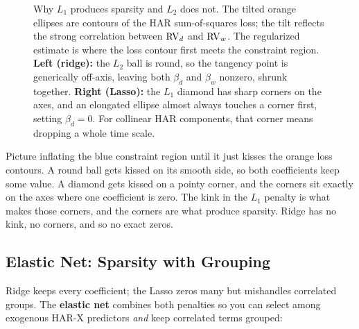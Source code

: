 \begin{figure}[htbp]
\caption{Why $L_1$ produces sparsity and $L_2$ does not.
The tilted orange ellipses are contours of the HAR sum-of-squares loss; the tilt reflects the strong correlation between $\operatorname{RV}_d$ and $\operatorname{RV}_w$.
The regularized estimate is where the loss contour first meets the constraint region.
\textbf{Left (ridge):} the $L_2$ ball is round, so the tangency point is generically off-axis, leaving both $\beta_d$ and $\beta_w$ nonzero, shrunk together.
\textbf{Right (Lasso):} the $L_1$ diamond has sharp corners on the axes, and an elongated ellipse almost always touches a corner first, setting $\beta_d = 0$.
For collinear HAR components, that corner means dropping a whole time scale.}
\label{fig:l1-l2-geometry}
\end{figure}

\begin{intuition}
Picture inflating the blue constraint region until it just kisses the orange loss contours.
A round ball gets kissed on its smooth side, so both coefficients keep some value.
A diamond gets kissed on a pointy corner, and the corners sit exactly on the axes where one coefficient is zero.
The kink in the $L_1$ penalty is what makes those corners, and the corners are what produce sparsity.
Ridge has no kink, no corners, and so no exact zeros.
\end{intuition}

\subsection{Elastic Net: Sparsity with Grouping}

Ridge keeps every coefficient; the Lasso zeros many but mishandles correlated groups.
The \textbf{elastic net} \citep{ZouHastie2005} combines both penalties so you can select among exogenous HAR-X predictors \emph{and} keep correlated terms grouped:

